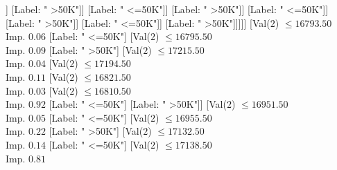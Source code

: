 \documentclass[margin=10pt]{standalone}
\begin{document}
\begin{forest}
																								[Val($2$) $ \leq 16663.50$ \\ Imp. $0.09$
																									[Val($2$) $ \leq 16643.50$ \\ Imp. $0.15$
																										[Val($2$) $ \leq 16627.50$ \\ Imp. $0.24$
																											[Val($2$) $ \leq 16600.50$ \\ Imp. $0.20$
																												[Val($2$) $ \leq 16594.50$ \\ Imp. $0.19$
																													[Val($2$) $ \leq 16589.50$ \\ Imp. $0.17$
																														[Val($2$) $ \leq 16583.50$ \\ Imp. $0.31$
																															[Val($2$) $ \leq 16578.50$ \\ Imp. $0.25$
																																[Label: " >50K"]
																																[Label: " <=50K"]]
																															[Label: " >50K"]]
																														[Label: " <=50K"]]
																													[Label: " >50K"]]
																												[Label: " <=50K"]]
																											[Label: " >50K"]]
																										[Label: " <=50K"]]
																									[Label: " >50K"]]]]]
																					[Val($2$) $ \leq 16793.50$ \\ Imp. $0.06$
																						[Label: " <=50K"]
																						[Val($2$) $ \leq 16795.50$ \\ Imp. $0.09$
																							[Label: " >50K"]
																							[Val($2$) $ \leq 17215.50$ \\ Imp. $0.04$
																								[Val($2$) $ \leq 17194.50$ \\ Imp. $0.11$
																									[Val($2$) $ \leq 16821.50$ \\ Imp. $0.03$
																										[Val($2$) $ \leq 16810.50$ \\ Imp. $0.92$
																											[Label: " <=50K"]
																											[Label: " >50K"]]
																										[Val($2$) $ \leq 16951.50$ \\ Imp. $0.05$
																											[Label: " <=50K"]
																											[Val($2$) $ \leq 16955.50$ \\ Imp. $0.22$
																												[Label: " >50K"]
																												[Val($2$) $ \leq 17132.50$ \\ Imp. $0.14$
																													[Label: " <=50K"]
																													[Val($2$) $ \leq 17138.50$ \\ Imp. $0.81$

\end{forest}
\end{document}
